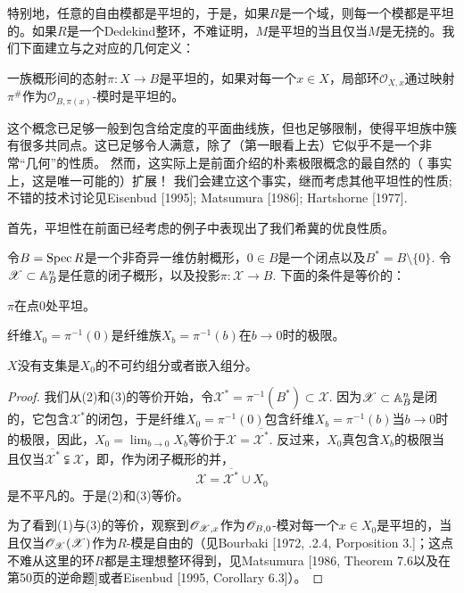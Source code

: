 特别地，任意的自由模都是平坦的，于是，如果$R$是一个域，则每一个模都是平坦的。如果$R$是一个Dedekind整环，不难证明，$M$是平坦的当且仅当$M$是无挠的。我们下面建立与之对应的几何定义：

\begin{defi}
	一族概形间的态射$\pi:X\to B$是平坦的，如果对每一个$x\in X$，局部环$\mathscr{O}_{X,x}$通过映射$\pi^\#$作为$\mathscr{O}_{B,\pi(x)}$\hyp 模时是平坦的。
\end{defi}

这个概念已足够一般到包含给定度的平面曲线族，但也足够限制，使得平坦族中簇有很多共同点。这已足够令人满意，除了（第一眼看上去）它似乎不是一个非常“几何”的性质。 然而，这实际上是前面介绍的朴素极限概念的最自然的（ 事实上，这是唯一可能的）扩展！ 我们会建立这个事实，继而考虑其他平坦性的性质; 不错的技术讨论见Eisenbud [1995]; Matsumura [1986]; Hartshorne [1977]. \nottran

首先，平坦性在前面已经考虑的例子中表现出了我们希冀的优良性质。

\begin{pro}\label{pro:2.29}
	令$B=\operatorname{Spec} R$是一个非奇异一维仿射概形，$0\in B$是一个闭点以及$B^*=B\setminus \{0\}$. 令$\mathscr{X}\subset \mathbb{A}_{B}^n$是任意的闭子概形，以及投影$\pi:\mathscr{X}\to B$. 下面的条件是等价的：
	\begin{compactenum}[\((1)\)]
		\item $\pi$在点$0$处平坦。
		\item 纤维$X_0=\pi^{-1}(0)$是纤维族$X_b=\pi^{-1}(b)$在$b\to 0$时的极限。
		\item $X$没有支集是$X_0$的不可约组分或者嵌入组分。
	\end{compactenum}
\end{pro}

\begin{proof}
我们从(2)和(3)的等价开始，令$\mathscr{X}^*=\pi^{-1}(B^*)\subset \mathscr{X}$. 因为$\mathscr{X}\subset \mathbb{A}_B^n$是闭的，它包含$\mathscr{X}^*$的闭包，于是纤维$X_0=\pi^{-1}(0)$包含纤维$X_b=\pi^{-1}(b)$当$b\to 0$时的极限，因此，$X_0=\lim_{b\to 0} X_b$等价于$\mathscr{X}=\overline{\mathscr{X}^*}$. 反过来，$X_0$真包含$X_b$的极限当且仅当$\overline{\mathscr{X}^*} \subsetneqq \mathscr{X}$，即，作为闭子概形的并，
\[
	\mathscr{X}=\overline{\mathscr{X}^*}\cup X_0
\]
是不平凡的。于是(2)和(3)等价。

为了看到(1)与(3)的等价，观察到$\mathscr{O}_{\mathscr{X},x}$作为$\mathscr{O}_{B,0}$\hyp 模对每一个$x\in X_0$是平坦的，当且仅当$\mathscr{O}_{\mathscr{X}}(\mathscr{X})$作为$R$\hyp 模是自由的（见Bourbaki [1972, \uppercase\expandafter{}.2.4, Porposition 3.\expandafter{}]；这点不难从这里的环$R$都是主理想整环得到，见Matsumura [1986, Theorem 7.6以及在第50页的逆命题]或者Eisenbud [1995, Corollary 6.3]）。
\end{proof}

